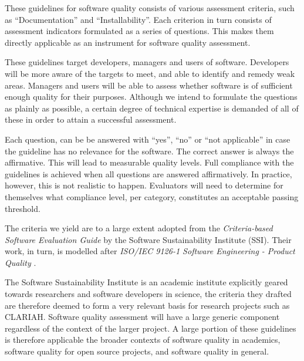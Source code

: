 \documentclass[a4paper,11pt]{article}
\begin{document}
These guidelines for software quality consists of various assessment
criteria, such as ``Documentation'' and ``Installability''. Each criterion in turn
consists of assessment indicators formulated as a series of questions. This
makes them directly applicable as an instrument for software quality
assessment. 

These guidelines target developers, managers and users of software.
Developers will be more aware of the targets to meet, and able to identify and
remedy weak areas. Managers and users will be able to assess whether software
is of sufficient enough quality for their purposes. Although we intend to
formulate the questions as plainly as possible, a certain degree of technical
expertise is demanded of all of these in order to attain a successful
assessment.

Each question, can be be answered with ``yes'', ``no'' or ``not applicable'' in
case the guideline has no relevance for the software. The correct answer is
always the affirmative. This will lead to measurable quality levels. Full
compliance with the guidelines is achieved when all questions are answered
affirmatively.  In practice, however, this is not realistic to happen.
Evaluators will need to determine for themselves what compliance level, per
category, constitutes an acceptable passing threshold.

The criteria we yield are  to a large extent adopted from the
\emph{Criteria-based Software Evaluation Guide} \citep{SSIGUIDE} by the Software
Sustainability Institute (SSI). Their work, in turn, is modelled after
\emph{ISO/IEC 9126-1 Software Engineering - Product Quality} \citep{ISO9126}.
%
%
%

The Software Sustainability Institute\citep{SSIGENERAL} is an academic institute
explicitly geared towards researchers and software developers in science, the
criteria they drafted are therefore deemed to form a very relevant basis for
research projects such as CLARIAH. Software quality assessment will have a
large generic component regardless of the context of the larger project. A
large portion of these guidelines is therefore applicable the broader contexts
of software quality in academics, software quality for open source projects, and
software quality in general.
\end{document}
